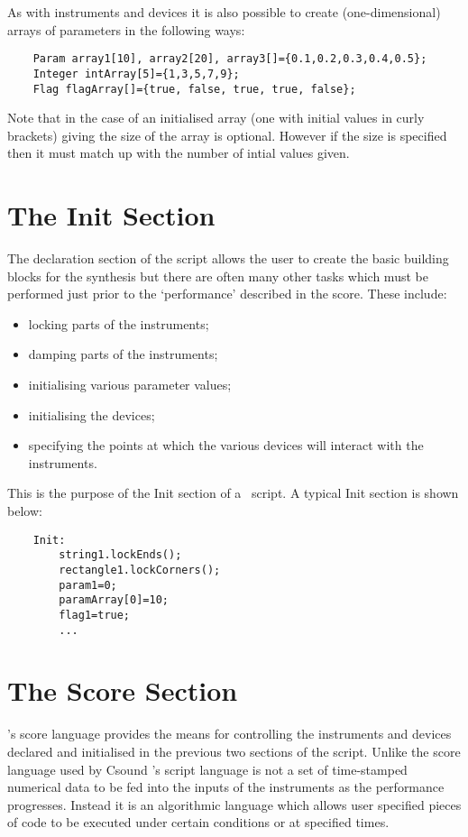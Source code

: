 As with instruments and devices it is also possible to create (one-dimensional)
arrays of parameters in the following ways:

\begin{verbatim}
    Param array1[10], array2[20], array3[]={0.1,0.2,0.3,0.4,0.5};
    Integer intArray[5]={1,3,5,7,9};
    Flag flagArray[]={true, false, true, true, false};
\end{verbatim}

Note that in the case of an initialised array (one with initial values
in curly brackets) giving the size of the array is optional. However
if the size is specified then it must match up with the number of
intial values given.

\section{The Init Section}
\label{section:init_section}
The declaration section of the script allows the user to create the basic
building blocks for the synthesis but there are often many other tasks
which must be performed just prior to the `performance' described in the
score. These include:

\begin{itemize}
\item locking parts of the instruments;
\item damping parts of the instruments;
\item initialising various parameter values;
\item initialising the devices;
\item specifying the points at which the various devices will interact
with the instruments.
\end{itemize}

This is the purpose of the Init section of a \tao\ script. A typical
Init section is shown below:

\begin{verbatim}
    Init:
        string1.lockEnds();
        rectangle1.lockCorners();
        param1=0;
        paramArray[0]=10;
        flag1=true;
        ...
\end{verbatim}

\section{The Score Section}
\label{section:score_section}
\tao's score language provides the means for controlling the instruments
and devices declared and initialised in the previous two sections of the
script. Unlike the score language used by Csound \tao's script
language is not a set of time-stamped numerical data to be fed into the
inputs of the instruments as the performance progresses. Instead it is
an algorithmic language which allows user specified pieces of code to be
executed under certain conditions or at specified times.

